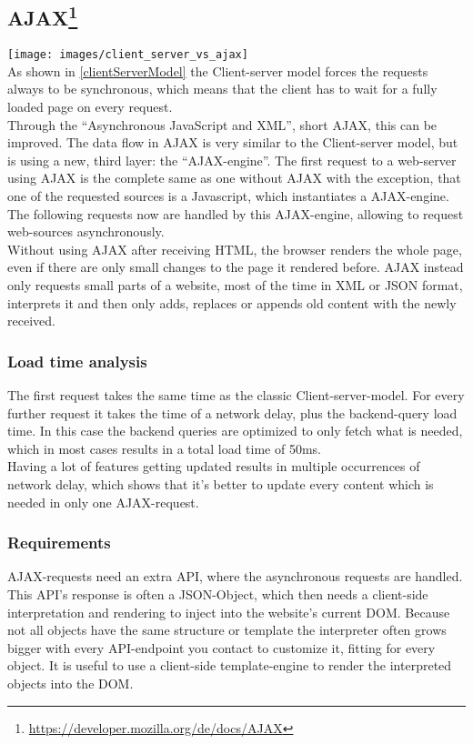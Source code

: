 \documentclass[f,bachelor,binding,twoside,palatino]{WeSTthesis}
\def \ajax {AJAX}
\begin{document}
    
  \subsection[\ajax]{\ajax{}\footnote{\url{https://developer.mozilla.org/de/docs/AJAX}}\label{ajax}}
    \texttt{[image: images/client\_server\_vs\_ajax]}\\
    As shown in \ref{clientServerModel} the Client-server model forces the requests always to be synchronous, which means that the client has to wait for a fully loaded page on every request.\\
    Through the \enquote{Asynchronous JavaScript and XML}, short \ajax{}, this can be improved. The data flow in AJAX is very similar to the Client-server model, but is using a new, third layer: the \enquote{\ajax{}-engine}.
    The first request to a web-server using \ajax{} is the complete same as one without \ajax{} with the exception, that one of the requested sources is a Javascript, which instantiates a \ajax{}-engine. The following requests now are handled by this \ajax{}-engine, allowing to request web-sources asynchronously.\\
    Without using \ajax{} after receiving HTML, the browser renders the whole page, even if there are only small changes to the page it rendered before. \ajax{} instead only requests small parts of a website, most of the time in XML or JSON format, interprets it and then only adds, replaces or appends old content with the newly received.
    \subsubsection{Load time analysis}
      The first request takes the same time as the classic Client-server-model. For every further request it takes the time of a network delay, plus the backend-query load time. In this case the backend queries are optimized to only fetch what is needed, which in most cases results in a total load time of 50ms.\\
      Having a lot of features getting updated results in multiple occurrences of network delay, which shows that it's better to update every content which is needed in only one \ajax{}-request.
    
    \subsubsection{Requirements}
    \ajax{}-requests need an extra API, where the asynchronous requests are handled. This API's response is often a JSON-Object, which then needs a client-side interpretation and rendering to inject into the website's current DOM. Because not all objects have the same structure or template the interpreter often grows bigger with every API-endpoint you contact to customize it, fitting for every object. It is useful to use a client-side template-engine to render the interpreted objects into the DOM.
\end{document}
